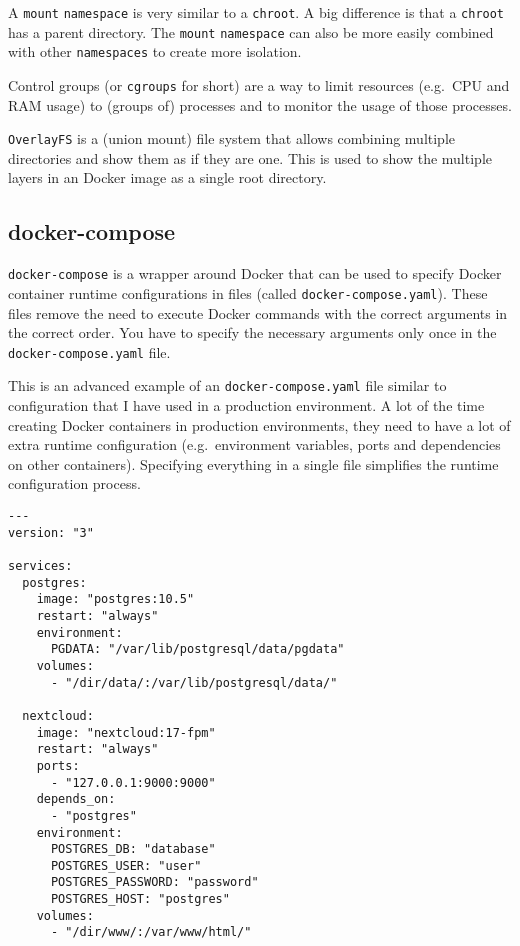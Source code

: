 A \lstinline{mount} \lstinline{namespace} is very similar to a \lstinline{chroot}. A big difference is that a \lstinline{chroot} has a parent directory. The \lstinline{mount} \lstinline{namespace} can also be more easily combined with other \lstinline{namespaces} to create more isolation.

\hfill

Control groups (or \lstinline{cgroups} for short) are a way to limit resources (e.g.\ CPU and RAM usage) to (groups of) processes and to monitor the usage of those processes.

\hfill

\lstinline{OverlayFS} is a (union mount) file system that allows combining multiple directories and show them as if they are one. This is used to show the multiple layers in an Docker image as a single root directory.


\subsection{docker-compose}
\lstinline{docker-compose} is a wrapper around Docker that can be used to specify Docker container runtime configurations in files (called \lstinline{docker-compose.yaml}). These files remove the need to execute Docker commands with the correct arguments in the correct order. You have to specify the necessary arguments only once in the \lstinline{docker-compose.yaml} file.

\hfill

This is an advanced example of an \lstinline{docker-compose.yaml} file similar to configuration that I have used in a production environment. A lot of the time creating Docker containers in production environments, they need to have a lot of extra runtime configuration (e.g.\ environment variables, ports and dependencies on other containers). Specifying everything in a single file simplifies the runtime configuration process.
\begin{lstlisting}[caption={Example \lstinline{docker-compose.yaml}},label={docker:composefile},captionpos=b]
---
version: "3"

services:
  postgres:
    image: "postgres:10.5"
    restart: "always"
    environment:
      PGDATA: "/var/lib/postgresql/data/pgdata"
    volumes:
      - "/dir/data/:/var/lib/postgresql/data/"

  nextcloud:
    image: "nextcloud:17-fpm"
    restart: "always"
    ports:
      - "127.0.0.1:9000:9000"
    depends_on:
      - "postgres"
    environment:
      POSTGRES_DB: "database"
      POSTGRES_USER: "user"
      POSTGRES_PASSWORD: "password"
      POSTGRES_HOST: "postgres"
    volumes:
      - "/dir/www/:/var/www/html/"
\end{lstlisting}

